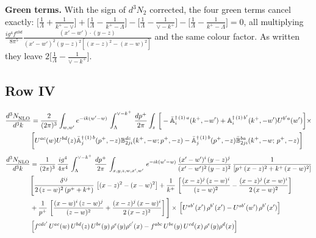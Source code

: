 \documentclass[9pt]{article}
\def\mf#1{\mathbb{#1}}
\numberwithin{equation}{section}
\begin{document}
\noindent\textbf{Green terms.} With the sign of $d^{3}N_{2}$ corrected, the four green terms cancel exactly:
$\big[\frac{1}{\Lambda}+\frac{1}{k^{+}-\vee}\big]+\big[\frac{1}{\Lambda}-\frac{1}{k^{+}-\Lambda}\big]-\big[\frac{1}{\Lambda}-\frac{1}{\vee-k^{+}}\big]-\big[\frac{1}{\Lambda}-\frac{1}{k^{+}-\Lambda}\big]=0$, all multiplying $\frac{ig^{4}f^{abd}}{8\pi^{5}}\frac{(x'-w')\cdot(y-z)}{(x'-w')^{2}(y-z)^{2}[(x-z)^{2}-(x-w)^{2}]}$ and the same colour factor. As written they leave $2\big[\frac{1}{\Lambda}-\frac{1}{\vee-k^{+}}\big]$.\par\endgroup
\subsection{Row IV\,}
\begin{align}
 \frac{d^{3}N_{\rm NLO}^{\rm}}{d^{3}k}  & = \frac{2}{(2\pi)^{3}}  \int_{w, w^\prime} e^{-ik(w^\prime-w)}\, \int_{\Lambda}^{\vee - k^{+}}\,\frac{dp^{+}}{2\pi} \int_{z}\,\bigg[-\bar{\mf{A}}^{\dagger\,(1)\,a}_{i}(k^{+},-w^{\prime})+\mf{A}^{\dagger\, (1)\, b^{\prime}}_{i}(k^{+},-w^{\prime})U^{b^{\prime}a}(w^{\prime})\bigg]\times \notag \\ & \bigg[U^{ac}(w)U^{bd}(z) \bar{\mf{A}}^{\dagger\, (1)\, b}_{j}(p^+,- z) {\mf{B}}^{dc}_{2ji} (k^+, -w;p^+, -z) - \Bar{\mf{A}}^{\dagger\, (1)\, b}_{j}(p^{+}, -z)\Bar{\mf{B}}^{ba}_{2ji}(k^{+},-w;\,p^{+}, -z) \bigg] \nonumber
\end{align}
\begin{align}
    \frac{d^{3}N_{\rm NLO}^{\rm}}{d^{3}k}  & = \frac{1}{(2\pi)^{3}}\,\frac{ig^{4}}{4\pi^{4}}\, \int_{\Lambda}^{\vee-k^{+}}\, \frac{dp^{+}}{2\pi}\, \int_{x,y,z,w,x',w'}\,e^{-ik(w^\prime-w)}\, \frac{(x'-w')^{i}\,(y-z)^{j}}{(x'-w')^{2}\,(y-z)^{2}}\, \frac{1}{\left[p^{+}\,(x-z)^{2}+k^{+}\,(x-w)^{2}\right]}\notag \\ & \Bigg[\frac{\delta^{ij}}{2\,(z-w)^{2}\,(p^{+}+k^{+})}\, \left[(x-z)^{2}-(x-w)^{2}\right]+\frac{1}{k^{+}}\,\left[\frac{(x-z)^{j}\,(z-w)^{i}}{(z-w)^{2}}-\frac{(x-z)^{j}\,(x-w)^{i}}{2\,(x-w)^{2}}\right]\notag \\ & + \frac{1}{p^{+}}\, \left[\frac{(x-w)^{i}\,(z-w)^{j}}{(z-w)^{2}}+\frac{(x-z)^{j}\,(x-w)^{i}}{2\,(x-z)^{2}}\right]\Bigg]\times\, \left[U^{ab'}(x')\,\rho^{b'}(x')-U^{ab'}(w')\,\rho^{b'}(x')\right]\notag \\ & \left[f^{cdc'}\,U^{ac}(w)\,U^{bd}(z)\,U^{be}(y)\,\rho^{e}(y)\rho^{c'}(x)-f^{abc}\,U^{be}(y)\,U^{cd}(x)\,\rho^{e}(y)\rho^{d}(x)\right] %
\end{align}
\end{document}
